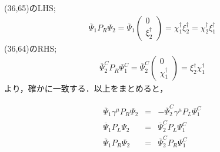(36,65)のLHS;
\begin{eqnarray}
\overline{\Psi}_{1}P_R\Psi_{2}=\overline{\Psi}_{1}\left(\begin{array}{c}0 \\\xi^{\dagger}_2\end{array}\right)=\chi^{\dagger}_1\xi^{\dagger}_2=\chi^{\dagger}_2\xi^{\dagger}_1
\end{eqnarray}
(36,64)のRHS;
\begin{eqnarray}
\overline{\Psi}_{2}^{C}P_R\Psi_{1}^{C}=\overline{\Psi}_{2}^{C}\left(\begin{array}{c}0 \\\chi_1^{\dagger}\end{array}\right)=\xi^{\dagger}_2\chi^{\dagger}_1
\end{eqnarray}より，確かに一致する．以上をまとめると，
\begin{empheqboxed}
\begin{eqnarray}
\overline{\Psi}_{1}\gamma^{\mu}P_{R}\Psi_{2}&=&-\overline{\Psi}_{2}^{C}\gamma^{\mu}P_{L}\Psi_{1}^C \\
\overline{\Psi}_{1}P_L\Psi_{2}&=&\overline{\Psi}_{2}^{C}P_L\Psi_{1}^{C} \\
\overline{\Psi}_{1}P_R\Psi_{2}&=&\overline{\Psi}_{2}^{C}P_R\Psi_{1}^{C}
\end{eqnarray}

\end{empheqboxed}
